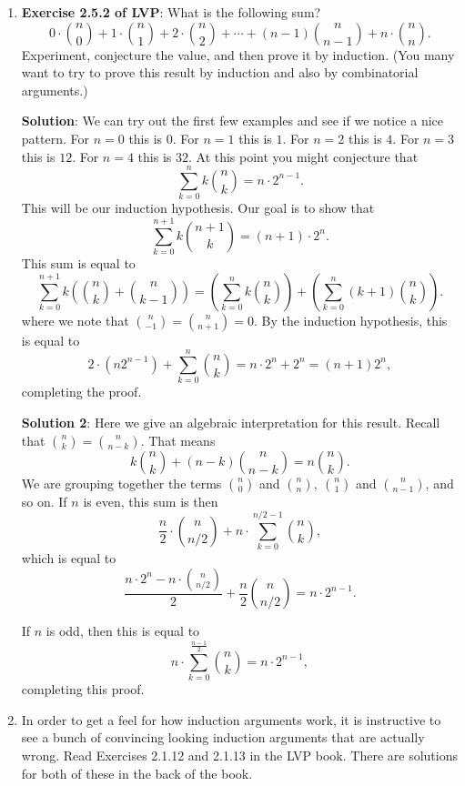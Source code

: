\documentclass[11pt]{article}
\begin{document}
\begin{enumerate}
\item {\bf Exercise 2.5.2 of LVP}: What is the following sum?
\[
0\cdot \binom{n}{0} + 1 \cdot \binom{n}{1} + 2\cdot \binom{n}{2} + \cdots + (n-1) \binom{n}{n-1} + n \cdot \binom{n}{n}.
\]
Experiment, conjecture the value, and then prove it by induction.  (You many want to try to prove this result by induction and also by combinatorial arguments.)


{\bf Solution}: We can try out the first few examples and see if we notice a nice pattern.  For $n=0$ this is $0$. For $n=1$ this is $1$.  For $n=2$ this is $4$.  For $n=3$ this is $12$.  For $n=4$ this is $32$.  At this point you might conjecture that 
\[
\sum_{k=0}^n k \binom{n}{k} = n \cdot 2^{n-1}.
\]  
This will be our induction hypothesis.  Our goal is to show that 
\[
\sum_{k=0}^{n+1} k \binom{n+1}{k} = (n+1) \cdot 2^n.
\]
This sum is equal to 
\[
\sum_{k=0}^{n+1} k \left( \binom{n}{k} + \binom{n}{k-1}\right) = \left(\sum_{k=0}^n k \binom{n}{k} \right) + \left( \sum_{k=0}^n (k+1) \binom{n}{k}\right).
\]
where we note that $\binom{n}{-1} = \binom{n}{n+1} = 0$.  By the induction hypothesis, this is equal to
\[
2 \cdot (n  2^{n-1}) + \sum_{k=0}^{n} \binom{n}{k} = n\cdot 2^n + 2^n = (n+1) 2^n,
\]
completing the proof.

{\bf Solution 2}:  Here we give an algebraic interpretation for this result.  Recall that $\binom{n}{k} = \binom{n}{n-k}$.  That means 
\[
k \binom{n}{k} + (n-k) \binom{n}{n-k} = n \binom{n}{k}.
\]
We are grouping together the terms $\binom{n}{0}$ and $\binom{n}{n},\ \binom{n}{1}$ and $\binom{n}{n-1}$, and so on.  If $n$ is even, this sum is then
\[
\frac{n}{2} \cdot \binom{n}{n/2} + n \cdot \sum_{k=0}^{n/2-1} \binom{n}{k},
\]
which is equal to 
\[
\frac{n\cdot 2^n - n \cdot \binom{n}{n/2}}{2} + \frac{n}{2} \binom{n}{n/2} = n \cdot 2^{n-1}.
\]

If $n$ is odd, then this is equal to 
\[
n \cdot \sum_{k=0}^{\frac{n-1}{2}}  \binom{n}{k} = n \cdot 2^{n-1},
\]
completing this proof.

\item In order to get a feel for how induction arguments work, it is instructive to see a bunch of convincing looking induction arguments that are actually wrong.  Read Exercises 2.1.12 and 2.1.13 in the LVP book.  There are solutions for both of these in the back of the book.  



\end{enumerate}
\end{document}
